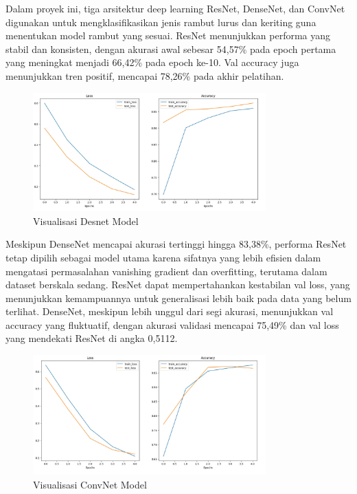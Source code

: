 \documentclass[12pt,a4paper]{article}
\begin{document}
Dalam proyek ini, tiga arsitektur deep learning ResNet, DenseNet, dan ConvNet digunakan untuk mengklasifikasikan jenis rambut lurus dan keriting guna menentukan model rambut yang sesuai. ResNet menunjukkan performa yang stabil dan konsisten, dengan akurasi awal sebesar 54,57\% pada epoch pertama yang meningkat menjadi 66,42\% pada epoch ke-10. Val accuracy juga menunjukkan tren positif, mencapai 78,26\% pada akhir pelatihan. 

\begin{figure}[h!]
    \centering
    \includegraphics[width=0.8\textwidth]{images/desnetfix.jpeg} %
    \caption{Visualisasi Desnet Model}
    \label{fig:result}
\end{figure}

Meskipun DenseNet mencapai akurasi tertinggi hingga 83,38\%, performa ResNet tetap dipilih sebagai model utama karena sifatnya yang lebih efisien dalam mengatasi permasalahan vanishing gradient dan overfitting, terutama dalam dataset berskala sedang. ResNet dapat mempertahankan kestabilan val loss, yang menunjukkan kemampuannya untuk generalisasi lebih baik pada data yang belum terlihat. DenseNet, meskipun lebih unggul dari segi akurasi, menunjukkan val accuracy yang fluktuatif, dengan akurasi validasi mencapai 75,49\% dan val loss yang mendekati ResNet di angka 0,5112. 

\begin{figure}[h!]
    \centering
    \includegraphics[width=0.8\textwidth]{images/convnetfix.jpeg} %
    \caption{Visualisasi ConvNet Model}
    \label{fig:result}
\end{figure}
\end{document}
